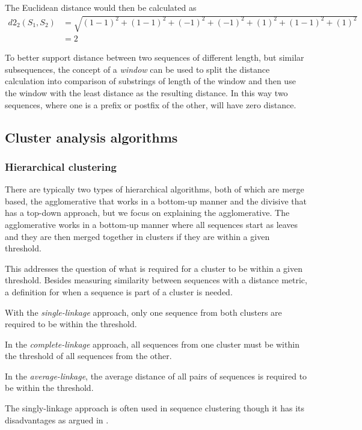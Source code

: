 The Euclidean distance would then be calculated as
\begin{align*}
  d2_2(S_1, S_2)
    &= \sqrt{(1-1)^2 + (1-1)^2 + (-1)^2 + (-1)^2 + (1)^2 + (1-1)^2 + (1)^2} \\
    &= 2
\end{align*}

To better support distance between two sequences of different length, but
similar subsequences, the concept of a \emph{window} can be used to split the
distance calculation into comparison of substrings of length of the window
and then use the window with the least distance as the resulting distance. In
this way two sequences, where one is a prefix or postfix of the other, will
have zero distance.



\subsection{Cluster analysis algorithms}


\subsubsection{Hierarchical clustering}
There are typically two types of hierarchical algorithms, both of which are
merge based, the agglomerative that works in a bottom-up manner and the
divisive that has a top-down approach, but we focus on explaining the
agglomerative. The agglomerative works in a bottom-up manner where all
sequences start as leaves and they are then merged together in clusters if they
are within a given threshold.


This addresses the question of what is required for a cluster to be within a
given threshold. Besides measuring similarity between sequences with a distance
metric, a definition for when a sequence is part of a cluster is needed.

With the \textit{single-linkage} approach, only one sequence from both
clusters are required to be within the threshold.

In the \textit{complete-linkage} approach, all sequences from one cluster
must be within the threshold of all sequences from the other.

In the \textit{average-linkage}, the average distance of all pairs of
sequences is required to be within the threshold.

The singly-linkage approach is often used in sequence clustering though it has
its disadvantages as argued in \cite[pp. 62-63]{dong}.

